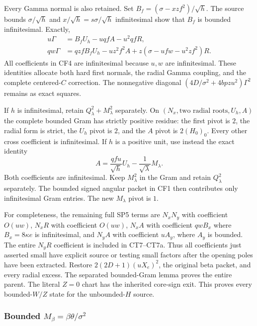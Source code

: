 Every Gamma normal is also retained. Set
$B_f=(\sigma-xzf^2)/\sqrt h$. The source bounds
$\sigma/\sqrt h$ and $x/\sqrt h=s\sigma/\sqrt h$ infinitesimal
show that $B_f$ is bounded infinitesimal. Exactly,
\[
\begin{split}
 u\Gamma&=B_fU_h-uqfA-u^2qfR,\\
 qw\Gamma&=qzfB_fU_h-uz^2f^2A
                 +z(\sigma-ufw-u^2zf^2)R.
\end{split}                                                   \tag{CF4}
\]
All coefficients in CF4 are infinitesimal because $u,w$ are
infinitesimal. These identities allocate both hard first normals,
the radial Gamma coupling, and the complete centered-$C$ correction.
The nonnegative diagonal
$(4D/\sigma^2+4bpzu^2)\Gamma^2$ remains as exact squares.

If $h$ is infinitesimal, retain $Q_\lambda^2+M_\lambda^2$
separately. On $(N_x,\text{two radial roots},U_h,A)$ the complete
bounded Gram has strictly positive residue: the first pivot is $2$,
the radial form is strict, the $U_h$ pivot is $2$, and the $A$
pivot is $2(H_0)_0$. Every other cross coefficient is infinitesimal.
If $h$ is a positive unit, use instead the exact identity
\[
 A=\frac{qfu}{\sqrt h}U_h-\frac{1}{\sqrt\lambda}M_\lambda.
                                                               \tag{CF5}
\]
Both coefficients are infinitesimal. Keep $M_\lambda^2$ in the Gram
and retain $Q_\lambda^2$ separately. The bounded signed angular
packet in CF1 then contributes only infinitesimal Gram entries.
The new $M_\lambda$ pivot is $1$.

For completeness, the remaining full SP5 terms are $N_xN_y$ with
coefficient $O(uw)$, $N_xR$ with coefficient $O(uw)$,
$N_xA$ with coefficient $qwB_x$ where $B_x=8\kappa e$ is
infinitesimal, and $N_yA$ with coefficient $uA_y$, where $A_y$ is
bounded. The entire $N_yR$ coefficient is included in CT7--CT7a.
Thus all coefficients just asserted small have explicit source or
testing small factors after the opening poles have been extracted.
Restore $2(2D+1)(uX_e)^2$, the original beta packet, and every
radial excess. The separated bounded-Gram lemma proves the entire
parent. The literal $Z=0$ chart has the inherited core-sign exit.
This proves every bounded-$W/Z$ state for the unbounded-$H$ source.

\subsubsection*{Bounded $M_\beta=\beta\theta/\sigma^2$}

